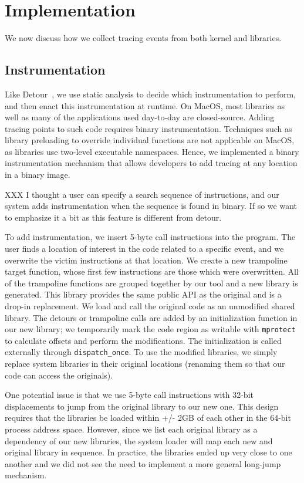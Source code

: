 \section{Implementation}
We now discuss how we collect tracing events from both kernel and libraries.

\subsection{Instrumentation}
Like Detour~\cite{detourXXXXXXXX}, we use static analysis to decide which instrumentation to perform, and then enact this instrumentation at runtime. 
On MacOS, most libraries as well as many of the applications used day-to-day are closed-source.
Adding tracing points to such code requires binary instrumentation.
Techniques such as library preloading to override individual functions are not applicable on MacOS, as libraries use two-level executable namespaces.
Hence, we implemented a binary instrumentation mechanism that allows developers to add tracing at any location in a binary image.

XXX I thought a user can specify a search sequence of instructions, and our system adds instrumentation when the sequence is found in binary.  If so we want to emphasize it a bit as this feature is different from detour.

To add instrumentation, we insert 5-byte call instructions into the program. The user finds a location of interest in the code related to a specific event,
and we overwrite the victim instructions at that location. We create a new trampoline target function, whose first few instructions are those which were overwritten.
All of the trampoline functions are grouped together by our tool and a new library is generated.
This library provides the same public API as the original and is a drop-in replacement. We load and call the original code as an unmodified shared library.
The detours or trampoline calls are added by an initialization function in our new library; we temporarily mark the code region as writable with \texttt{mprotect}
to calculate offsets and perform the modifications. The initialization is called externally through \texttt{dispatch\_once}.
To use the modified libraries, we simply replace system libraries in their original locations (renaming them so that our code can access the originals).

One potential issue is that we use 5-byte call instructions with 32-bit displacements to jump from the original library to our new one.
This design requires that the libraries be loaded within +/- 2GB of each other in the 64-bit process address space.
However, since we list each original library as a dependency of our new libraries, the system loader will map each new and original library in sequence.
In practice, the libraries ended up very close to one another and we did not see the need to implement a more general long-jump mechanism.

